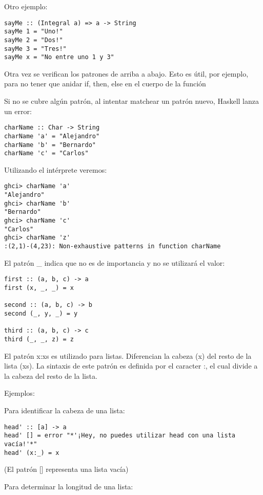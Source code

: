 Otro ejemplo:

\begin{lstlisting}
sayMe :: (Integral a) => a -> String
sayMe 1 = "Uno!"
sayMe 2 = "Dos!"
sayMe 3 = "Tres!"
sayMe x = "No entre uno 1 y 3"
\end{lstlisting}

Otra vez se verifican los patrones de arriba a abajo. Esto es útil, por ejemplo, para no tener que anidar if, then, else en el cuerpo de la función

Si no se cubre algún patrón, al intentar matchear un patrón nuevo, Haskell lanza un error:

\begin{lstlisting}
charName :: Char -> String
charName 'a' = "Alejandro"
charName 'b' = "Bernardo"
charName 'c' = "Carlos"
\end{lstlisting}

Utilizando el intérprete veremos:

\begin{lstlisting}
ghci> charName 'a'
"Alejandro"
ghci> charName 'b'
"Bernardo"
ghci> charName 'c'
"Carlos"
ghci> charName 'z'
:(2,1)-(4,23): Non-exhaustive patterns in function charName
\end{lstlisting}

El patrón \_ indica que no es de importancia y no se utilizará el valor:

\begin{lstlisting}
first :: (a, b, c) -> a
first (x, _, _) = x

second :: (a, b, c) -> b
second (_, y, _) = y

third :: (a, b, c) -> c
third (_, _, z) = z
\end{lstlisting}

El patrón x:xs es utilizado para listas. Diferencian la cabeza (x) del resto de la lista (xs). La sintaxis de este patrón es definida por el caracter :, el cual divide a la cabeza del resto de la lista.

Ejemplos:

Para identificar la cabeza de una lista:

\begin{lstlisting}
head' :: [a] -> a
head' [] = error "*'¡Hey, no puedes utilizar head con una lista vacía!'*"
head' (x:_) = x
\end{lstlisting}

(El patrón [] representa una lista vacía)

Para determinar la longitud de una lista:


